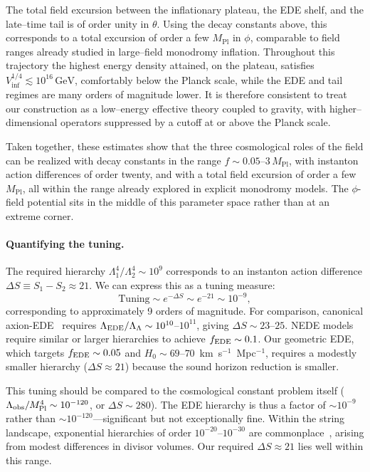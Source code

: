 \documentclass[a4paper,11pt]{article}
\begin{document}
The total field excursion between the inflationary plateau, the EDE shelf, and the late–time tail is of order unity in $\theta$. Using the decay constants above, this corresponds to a total excursion of order a few $M_{\text{Pl}}$ in $\phi$, comparable to field ranges already studied in large–field monodromy inflation. Throughout this trajectory the highest energy density attained, on the plateau, satisfies $V_{\text{inf}}^{1/4} \lesssim 10^{16}\,\text{GeV}$, comfortably below the Planck scale, while the EDE and tail regimes are many orders of magnitude lower. It is therefore consistent to treat our construction as a low–energy effective theory coupled to gravity, with higher–dimensional operators suppressed by a cutoff at or above the Planck scale.

Taken together, these estimates show that the three cosmological roles of the field can be realized with decay constants in the range $f \sim 0.05\text{--}3\,M_{\text{Pl}}$, with instanton action differences of order twenty, and with a total field excursion of order a few $M_{\text{Pl}}$, all within the range already explored in explicit monodromy models. The $\phi$-field potential sits in the middle of this parameter space rather than at an extreme corner.

\paragraph{Quantifying the tuning.}
The required hierarchy $\Lambda_1^4/\Lambda_2^4 \sim 10^9$ corresponds to an instanton action difference $\Delta S \equiv S_1 - S_2 \approx 21$. We can express this as a tuning measure:
\begin{equation}
\text{Tuning} \sim e^{-\Delta S} \sim e^{-21} \sim 10^{-9},
\end{equation}
corresponding to approximately 9 orders of magnitude. For comparison, canonical axion-EDE~\cite{Poulin_EDE} requires $\Lambda_{\rm EDE}/\Lambda_{\Lambda} \sim 10^{10}$--$10^{11}$, giving $\Delta S \sim 23$--$25$. NEDE models~\cite{Niedermann_NewEDE} require similar or larger hierarchies to achieve $f_{\rm EDE} \sim 0.1$. Our geometric EDE, which targets $f_{\rm EDE} \sim 0.05$ and $H_0 \sim 69$--$70$~km~s$^{-1}$~Mpc$^{-1}$, requires a modestly smaller hierarchy ($\Delta S \approx 21$) because the sound horizon reduction is smaller.

This tuning should be compared to the cosmological constant problem itself ($\Lambda_{\rm obs}/M_{\rm Pl}^4 \sim 10^{-120}$, or $\Delta S \sim 280$). The EDE hierarchy is thus a factor of $\sim 10^{-9}$ rather than $\sim 10^{-120}$---significant but not exceptionally fine. Within the string landscape, exponential hierarchies of order $10^{-20}$--$10^{-30}$ are commonplace~\cite{Denef_Douglas}, arising from modest differences in divisor volumes. Our required $\Delta S \approx 21$ lies well within this range.
\end{document}
